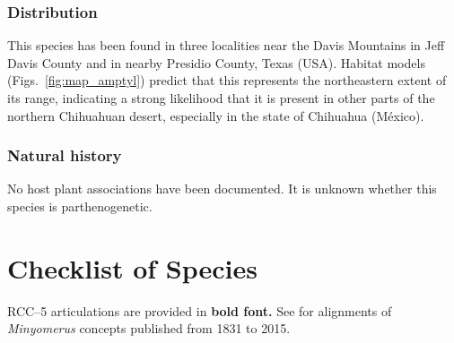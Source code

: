 \documentclass[fleqn,10pt,lineno]{wlpeerj} %
\begin{document}
		\subsubsection*{Distribution}
			This species has been found in three localities near the Davis Mountains in Jeff Davis County and in nearby Presidio County, Texas (USA).
			Habitat models (Figs.~\ref{fig:map_amptyl}) predict that this represents the northeastern extent of its range, indicating a strong likelihood that it is present in other parts of the northern Chihuahuan desert, especially in the state of Chihuahua (M\'{e}xico).
		\subsubsection*{Natural history}
			No host plant associations have been documented.
			It is unknown whether this species is parthenogenetic.
\newpage
\section*{Checklist of Species}\label{sec:checklist}
	RCC--5 articulations are provided in \textbf{bold font.} See \citet{jansen2015} for alignments of \textit{Minyomerus} concepts published from 1831 to 2015. 
	
\end{document}
